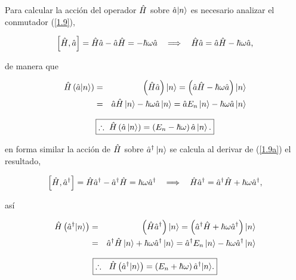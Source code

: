 \begin{solution}

Para calcular la acci\'{o}n del operador $\hat{H}$ sobre $\hat{a} |n\rangle $ es necesario analizar el conmutador (\ref{1.9}),

\begin{equation*}
\left[ \hat{H},\hat{a} \right] =\hat{H} \hat{a}-\hat{a} \hat{H}=-\hbar \omega \hat{a} ~\ \implies ~\ \hat{H} \hat{a} = \hat{a} \hat{H}-\hbar \omega \hat{a},
\end{equation*}

de manera que 

\begin{eqnarray}
\hat{H} \left( \hat{a} |n\rangle \right) &=&\left( \hat{H} \hat{a} \right) \left\vert n\right\rangle =\left( \hat{a} \hat{H}-\hbar \omega \hat{a} \right) \left\vert n\right\rangle  \notag \\
&=& \hat{a} \hat{H}\left\vert n\right\rangle -\hbar \omega \hat{a} \left\vert n \right\rangle =\hat{a} E_{n}\left\vert n\right\rangle -\hbar \omega \hat{a} \left\vert n\right\rangle \notag
\end{eqnarray}

\begin{equation}
\boxed{
    \therefore ~ \hat{H} \left( \hat{a} \left\vert n\right\rangle \right) =\left( E_{n}-\hbar \omega \right) \hat{a} \left\vert n\right\rangle  \label{1.12a}.
    }
\end{equation}

en forma similar la acci\'{o}n de $\hat{H}$ sobre $\hat{a}^{\dagger }\left\vert n\right\rangle $ se calcula al derivar de (\ref{1.9a}) el resultado,

\begin{equation*}
	\left[ \OoH,\Oaa^{\dagger }\right] =\OoH \Oaa^{\dagger }- \Oaa^{\dagger }\OoH=\hbar \omega \Oaa^{\dagger }~\ \implies ~\ \OoH \Oaa^{\dagger }=\Oaa^{\dagger } \OoH+\hbar \omega \Oaa^{\dagger},
\end{equation*}

así

\begin{eqnarray}
\hat{H} \left( \hat{a}^{\dagger }|n\rangle \right) &=&\left( \hat{H} \hat{a}^{\dagger }\right)
\left\vert n\right\rangle =\left( \hat{a}^{\dagger } \hat{H}+\hbar \omega \hat{a}^{\dagger
}\right) \left\vert n\right\rangle  \notag \\
&=& \hat{a}^{\dagger } \hat{H} \left\vert n\right\rangle +\hbar \omega \hat{a}^{\dagger
}\left\vert n\right\rangle =\hat{a}^{\dagger }E_{n}\left\vert n\right\rangle
-\hbar \omega \hat{a}^{\dagger }\left\vert n\right\rangle  \notag
\end{eqnarray}

\begin{equation}
    \boxed{
\therefore ~~ \hat{H} \left( \hat{a}^{\dagger }|n \rangle \right) =\left( E_{n}+\hbar
\omega \right) \hat{a}^{\dagger }|n\rangle  \label{1.12b}.
    }
\end{equation}

\end{solution}


